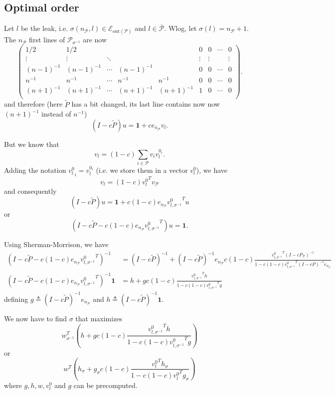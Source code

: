 \documentclass{article}
\newcommand{\1}{\mathbf{1}}
\theoremstyle{definition}
\begin{document}
\subsection{Optimal order}
Let \(l\) be the leak, i.e. \(\sigma(n_\mathcal{P},l) \in \mathcal{E}_{\text{out}(\mathcal{P})}\) and \(l \in \overline{\mathcal{P}}\).
Wlog, let \(\sigma(l) = n_{\mathcal{P}}+1\).
The \(n_\mathcal{P}\) first lines of \(\mathcal{P}_{\sigma^{-1}}\) are now
\[
  \begin{pmatrix}
    1/2 & 1/2 & & & & 0 & 0 & \cdots & 0\\
    \vdots & \vdots & \ddots & & & \vdots & \vdots & & \vdots \\
    (n-1)^{-1} & (n-1)^{-1} & \cdots & (n-1)^{-1} & & 0 & 0 & \cdots & 0\\
    n^{-1} & n^{-1} & \cdots & n^{-1} & n^{-1} & 0 & 0 & \cdots & 0\\
    (n+1)^{-1} & (n+1)^{-1} & \cdots & (n+1)^{-1} & (n+1)^{-1} & 1 & 0 & \cdots & 0\\
  \end{pmatrix}.
\]
and therefore (here $\tilde{P}$ has a bit changed, its last line contains now now $(n+1)^{-1}$ instead of $n^{-1}$)
\[ (I - c\tilde{P})u = \1 + c e_{n_\mathcal{P}} v_l. \]

But we know that
\[ v_l = (1-c) \sum_{i \in \mathcal{P}} v_i v_l^{0_i}. \]
Adding the notation ${v_l^0}_i = v_l^{0_i}$ (i.e. we store them in a vector $v_l^0$),
we have
\[ v_l = (1-c) {v_l^0}^T v_\mathcal{P} \]
and consequently
\[ (I - c\tilde{P})u = \1 + c (1-c) e_{n_\mathcal{P}} {v_{l,\sigma^{-1}}^0}^T u \]
or
\[ (I - c\tilde{P} - c (1-c) e_{n_\mathcal{P}} {v_{l,\sigma^{-1}}^0}^T)u = \1. \]

Using Sherman-Morrison, we have
\begin{align*}
  (I - c\tilde{P} - c (1-c) e_{n_\mathcal{P}} {v_{l,\sigma^{-1}}^0}^T)^{-1} & = (I - c\tilde{P})^{-1} + (I - c\tilde{P})^{-1}e_{n_\mathcal{P}} c(1-c) \frac{{v_{l,\sigma^{-1}}^0}^T(I-cP_\mathcal{P})^{-1}}{1 - c(1-c){v_{l,\sigma^{-1}}^0}^T(I-cP)^{-1}e_{n_\mathcal{P}}}\\
  (I - c\tilde{P} - c (1-c) e_{n_\mathcal{P}} {v_{l,\sigma^{-1}}^0}^T)^{-1}\1 & = h + g c(1-c) \frac{{v_{l,\sigma^{-1}}^0}^Th}{1 - c(1-c){v_{l,\sigma^{-1}}^0}^Tg}
\end{align*}
defining \(g \triangleq (I - c\tilde{P})^{-1}e_{n_\mathcal{P}}\) and \(h \triangleq (I - c\tilde{P})^{-1}\1\).

We now have to find $\sigma$ that maximizes
\[ w_{\sigma^{-1}}^T \left(h + g c(1-c) \frac{{v_{l,\sigma^{-1}}^0}^Th}{1 - c(1-c){v_{l,\sigma^{-1}}^0}^Tg}\right) \]
or
\[ w^T \left(h_\sigma + g_\sigma c(1-c) \frac{{v_l^0}^Th_\sigma}{1 - c(1-c){v_l^0}^Tg_\sigma}\right) \]
where \(g,h,w,v_l^0\) and \(g\) can be precomputed.
\end{document}
